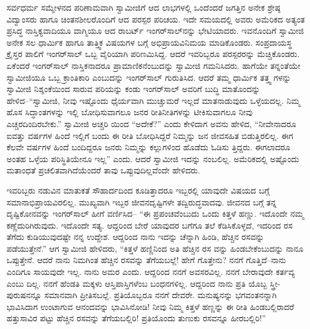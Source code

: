 ಸರ್ವಧರ್ಮ ಸಮ್ಮೇಳನದ ಪರಿಣಾಮವಾಗಿ ಸ್ವಾಮೀಜಿಗೆ ಆದ ಲಾಭಗಳಲ್ಲಿ ಒಂದೆಂದರೆ ಜಗತ್ತಿನ ಅನೇಕ ಶ್ರೇಷ್ಠ ವಿದ್ವಾಂಸರು ಹಾಗೂ ಚಿಂತನಶೀಲರೊಂದಿಗೆ ಆದ ಪರಸ್ಪರ ಪರಿಚಯ. ಇದೇ ಸಮಯದಲ್ಲಿ ಅವರು ಅಮೆರಿಕದ ಅತ್ಯಂತ ಪ್ರಸಿದ್ಧ ನಾಸ್ತಿಕ್ಯವಾದಿಯೂ ವಾಗ್ಮಿಯೂ ಆದ ರಾಬರ್ಟ್ ಇಂಗರ್​ಸಾಲ್​ನನ್ನು ಭೇಟಿಯಾದರು. ಇವನೊಂದಿಗೆ ಸ್ವಾಮೀಜಿ ಅನೇಕ ಸಲ ಧಾರ್ಮಿಕ ಹಾಗೂ ತಾತ್ತ್ವಿಕ ವಿಷಯಗಳ ಬಗ್ಗೆ ಅಭಿಪ್ರಾಯವಿನಿಮಯ ಮಾಡಿಕೊಂಡರು. ಸಂಪ್ರದಾಯಸ್ಥ ಕ್ರೈಸ್ತರ ಪಾಲಿಗೆ ಇಂಗರ್​ಸಾಲ್ ಒಬ್ಬ ವೈರಿಯಾಗಿ ಪರಿಣಮಿಸಿದ್ದ. ಆದರೆ ಇವರಿಬ್ಬರೂ ಪರಸ್ಪರರನ್ನು ಮೆಚ್ಚಿಕೊಂಡರು. ಏಕೆಂದರೆ ಇಂಗರ್​ಸಾಲ್ ನಾಸ್ತಿಕನಾದರೂ ಪ್ರಾಮಾಣಿಕನೆಂಬುದನ್ನು ಸ್ವಾಮೀಜಿ ಗಮನಿಸಿದರು. ಹಾಗೆಯೇ ತನ್ನಂತೆಯೇ ಸ್ವಾಮೀಜಿಯೂ ಒಬ್ಬ ಕ್ರಾಂತಿಕಾರಿ ಎಂಬುದನ್ನು ಇಂಗರ್​ಸಾಲ್ ಗುರುತಿಸಿದ. ಆದರೆ ತಮ್ಮ ಧಾರ್ಮಿಕ ತತ್ತ್ವ ಗಳನ್ನು ಸ್ವಾಮೀಜಿ ನಿಶ್ಶಂಕೆಯಿಂದ ಸಾರುವ ಪರಿಯನ್ನು ಕಂಡು ಇಂಗರ್​ಸಾಲ್ ಅವರಿಗೆ ಬುದ್ಧಿ ಮಾತೊಂದನ್ನು ಹೇಳಿದ–“ಸ್ವಾಮೀಜಿ, ನೀವು ಇಷ್ಟೊಂದು ಧೈರ್ಯವಾಗಿ ಮುಚ್ಚುಮರೆ ಇಲ್ಲದೆ ಮಾತನಾಡುವುದು ಒಳ್ಳೆಯದಲ್ಲ. ನಿಮ್ಮ ಹೊಸ ಸಿದ್ಧಾಂತಗಳನ್ನು ಇಲ್ಲಿ ಬೋಧಿಸುವಾಗಲೂ ಜನರ ರೀತಿನೀತಿಗಳನ್ನು ಟೀಕಿಸುವಾಗಲೂ ನೀವು ಎಚ್ಚರದಿಂದಿರಬೇಕು.” ಸ್ವಾಮೀಜಿ ಅಚ್ಚರಿ ಯಿಂದ “ಅದೇಕೆ?” ಎಂದು ಕೇಳಿದಾಗ ಅವನು ಹೇಳಿದ, “ನೀವೇನಾದರೂ ಐವತ್ತು ವರ್ಷಗಳ ಹಿಂದೆ ಇಲ್ಲಿಗೆ ಬಂದು ಈ ರೀತಿ ಬೋಧಿಸಿದ್ದರೆ ನಿಮ್ಮನ್ನು ಜನ ಜೀವಸಹಿತ ಬಿಡುತ್ತಿರಲಿಲ್ಲ. ಈಗ ಕೆಲವೇ ವರ್ಷಗಳ ಹಿಂದೆ ಬಂದಿದ್ದರೂ ಜನರು ನಿಮ್ಮನ್ನು ಕಲ್ಲುಗಳಿಂದ ಹೊಡೆದು ಓಡಿಸು ತ್ತಿದ್ದರು. ಈಗಲಾದರೂ ಅಂತಹ ಒಳ್ಳೆಯ ಪರಿಸ್ಥಿತಿಯೇನೂ ಇಲ್ಲ” ಎಂದು. ಆದರೆ ಸ್ವಾಮೀಜಿ ಇದನ್ನು ನಂಬಲಿಲ್ಲ. ಅಮೆರಿಕದಲ್ಲಿ ಅಷ್ಟೊಂದು ಮತಾಂಧತೆ ಪ್ರಚಲಿತವಾಗಿದೆಯೆಂದರೆ ತಾವು ಒಪ್ಪುವುದಿಲ್ಲವೆಂದೇ ಹೇಳಿದರು.

ಇವರಿಬ್ಬರು ನಡುವಿನ ಮಾತುಕತೆ ಸೌಹಾರ್ದದಿಂದ ಕೂಡಿತ್ತಾದರೂ ಇಬ್ಬರಲ್ಲಿ ಯಾವುದೇ ವಿಷಯದ ಬಗ್ಗೆ ಸಮಾನಾಭಿಪ್ರಾಯವಿರಲಿಲ್ಲ. ಮುಖ್ಯವಾಗಿ ಇಬ್ಬರ ಜೀವನದೃಷ್ಟಿಗಳೇ ತದ್ವಿರುದ್ಧವಾದವು. ಜೀವನದ ಬಗ್ಗೆ ತನ್ನ ದೃಷ್ಟಿಕೋನವನ್ನು ಇಂಗರ್​ಸಾಲ್ ಹೀಗೆ ವರ್ಣಿಸಿದ– “ಈ ಪ್ರಪಂಚವೆಂಬುದು ಒಂದು ಕಿತ್ತಳೆ ಹಣ್ಣು. ಇದೊಂದೇ ನಮ್ಮ ಕಣ್ಣೆದುರಿಗಿರುವುದು. ಇದೊಂದೇ ಸತ್ಯ. ಆದ್ದರಿಂದ ಬೇರೆ ಯಾವುದರ ಬಗೆಗೂ ತಲೆ ಕೆಡಿಸಿಕೊಳ್ಳದೆ, ಇದರಿಂದ ರಸ ತೆಗೆದು ಕುಡಿಯುವುದಷ್ಟೇ ನನ್ನ ಉದ್ದೇಶ. ಆದ್ದರಿಂದ ನಾನು ಇದನ್ನು ಚೆನ್ನಾಗಿ ಹಿಂಡಿ, ಹೆಚ್ಚಿನ ರಸವನ್ನು ಪಡೆಯುತ್ತೇನೆ.” ಆಗ ಸ್ವಾಮೀಜಿ ಹೇಳಿದರು, “ಕಿತ್ತಳೆ ಹಣ್ಣಿನಿಂದ ಅತಿ ಹೆಚ್ಚಿನ ರಸ ವನ್ನು ಹಿಂಡಬೇಕೆಂಬುದನ್ನು ನಾನೂ ಒಪ್ಪುತ್ತೇನೆ. ಆದರೆ ನಾನು ನಿಮಗಿಂತ ಹೆಚ್ಚಿನ ರಸವನ್ನು ತೆಗೆಯಬಲ್ಲೆ! ಹೇಗೆ ಗೊತ್ತೇನು? ನನಗೆ ಗೊತ್ತಿದೆ–ನಾನು ಎಂದಿಗೂ ಸಾಯವುದೇ ಇಲ್ಲ. ನಾನು ಅಮರ ಎಂದು. ಆದ್ದರಿಂದ ನನಗೆ ಅವಸರವಿಲ್ಲ. ನನಗೆ ಬೇರಾವುದೇ ಕರ್ತವ್ಯ ಎಂಬು ದಿಲ್ಲ. ನನಗೆ ಹೆಂಡತಿ ಮಕ್ಕಳು ಆಸ್ತಿಪಾಸ್ತಿಗಳೆಂಬ ಬಂಧನಗಳಿಲ್ಲ. ಆದ್ದರಿಂದ ನಾನು ಪ್ರತಿ ಯೊಬ್ಬ ಸ್ತ್ರೀ-ಪುರುಷನನ್ನೂ ಸಮಾನವಾಗಿ ಪ್ರೀತಿಸಬಲ್ಲೆ. ಪ್ರತಿಯೊಬ್ಬರೂ ನನಗೆ ದೇವರೇ. ಮನುಷ್ಯನನ್ನು ಭಗವಂತನನ್ನಾಗಿ ಭಾವಿಸಿದಾಗ ಉಂಟಾಗುವ ಆನಂದವನ್ನು ಭಾವಿಸಿನೋಡಿ! ನೀವು ನಿಮ್ಮ ಕಿತ್ತಳೆ ಹಣ್ಣನ್ನು ಈ ರೀತಿ ಹಿಂಡಬಲ್ಲಿರಾದರೆ ಹತ್ತುಸಾವಿರ ಪಟ್ಟು ಹೆಚ್ಚಿನ ರಸವನ್ನು ತೆಗೆಯಬಲ್ಲಿರಿ! ಪ್ರತಿಯೊಂದು ತುಣುಕು ರಸವನ್ನೂ ಹೀರಬಲ್ಲಿರಿ!”

